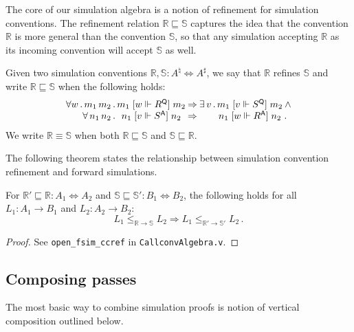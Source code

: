 \documentclass[sigplan,10pt,review,anonymous]{acmart}
\newcommand{\kw}[1]{\ensuremath{ \mathsf{#1} }}
\newcommand{\ifr}[1]{\mathrel{[{#1}]}}
\begin{document}
The core of our simulation algebra is
a notion of refinement for simulation conventions.
The refinement relation $\mathbb{R} \sqsubseteq \mathbb{S}$
captures the idea that the convention $\mathbb{R}$
is more general than the convention $\mathbb{S}$,
so that any simulation accepting $\mathbb{R}$ as its
incoming convention will accept $\mathbb{S}$ as well.

\begin{definition} %
Given two simulation conventions
$\mathbb{R}, \mathbb{S} : A^\natural \Leftrightarrow A^\sharp$,
we say that
$\mathbb{R}$ refines $\mathbb{S}$ and write
$\mathbb{R} \sqsubseteq \mathbb{S}$
when the following holds:
\[
    \begin{array}{r@{}c@{\:\Rightarrow\:}c@{}c@{}l}
      \forall w \,.\, m_1 \, m_2 \,.\, &
      m_1 \ifr{w \Vdash R^\kw{Q}} m_2 &
      \exists \, v \,.\, &
      m_1 \ifr{v \Vdash S^\kw{Q}} m_2 &
      \: \wedge \\
      \forall \, n_1 \, n_2 \,.\, &
      n_1 \ifr{v \Vdash S^\kw{A}} n_2 &
      &
      n_1 \ifr{w \Vdash R^\kw{A}} n_2 & \,.
    \end{array}
\]
We write $\mathbb{R} \equiv \mathbb{S}$ when both
$\mathbb{R} \sqsubseteq \mathbb{S}$ and
$\mathbb{S} \sqsubseteq \mathbb{R}$.
\end{definition}

The following theorem states the relationship between
simulation convention refinement and forward simulations.

\begin{theorem} %
For
$\mathbb{R}' \sqsubseteq \mathbb{R} : A_1 \Leftrightarrow A_2$ and
$\mathbb{S} \sqsubseteq \mathbb{S}' : B_1 \Leftrightarrow B_2$,
the following holds for all
$L_1 : A_1 \rightarrow B_1$ and $L_2 : A_2 \rightarrow B_2$:
\[
      L_1 \le_{\mathbb{R} \rightarrow \mathbb{S}} L_2 \Rightarrow
      L_1 \le_{\mathbb{R}' \rightarrow \mathbb{S}'} L_2 \,.
\]
\begin{proof}
See \texttt{open\_fsim\_ccref} in \texttt{CallconvAlgebra.v}.
\end{proof}
\end{theorem}


\subsection{Composing passes} %

The most basic way to combine simulation proofs
is notion of vertical composition outlined below.
\end{document}
